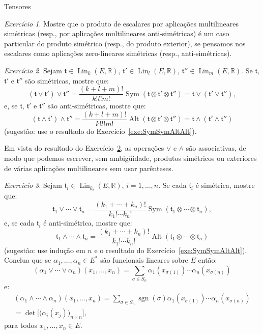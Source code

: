 \documentclass[oneside,11pt]{amsart}
\newcommand{\R}{\mathds R}
\DeclareMathOperator{\Lin}{Lin}
\DeclareMathOperator{\sgn}{sgn}
\DeclareMathOperator{\Sym}{Sym}
\DeclareMathOperator{\Alt}{Alt}
\theoremstyle{remark}\newtheorem{exercise}{Exercício}[section]
\theoremstyle{plain}\newtheorem{teo}{Teorema}[section]
\theoremstyle{plain}\newtheorem{lem}[teo]{Lema}
\theoremstyle{plain}\newtheorem{prop}[teo]{Proposição}
\theoremstyle{definition}\newtheorem{defin}[teo]{Definição}
\theoremstyle{remark}\newtheorem{rem}[teo]{Observação}
\theoremstyle{definition}\newtheorem{example}[teo]{Exemplo}
\numberwithin{equation}{section}
\begin{document}
\begin{section}{Tensores}
\begin{exercise}\label{exe:wedgeveezero}
Mostre que o produto de escalares por aplicações multilineares simétricas (resp., por aplicações multilineares anti-simétricas) é um caso particular
do produto simétrico (resp., do produto exterior), se pensamos nos escalares como aplicações zero-lineares simétricas (resp., anti-simétricas).
\end{exercise}

\begin{exercise}\label{exe:veewedgeassoc}
Sejam $\mathfrak t\in\Lin_k(E,\R)$, $\mathfrak t'\in\Lin_l(E,\R)$, $\mathfrak t''\in\Lin_m(E,\R)$. Se $\mathfrak t$, $\mathfrak t'$ e $\mathfrak t''$ são
simétricas, mostre que:
\[(\mathfrak t\vee\mathfrak t')\vee\mathfrak t''=\frac{(k+l+m)!}{k!l!m!}\Sym(\mathfrak t\otimes\mathfrak t'\otimes\mathfrak t'')=
\mathfrak t\vee(\mathfrak t'\vee\mathfrak t''),\]
e, se $\mathfrak t$, $\mathfrak t'$ e $\mathfrak t''$ são anti-simétricas, mostre que:
\[(\mathfrak t\wedge\mathfrak t')\wedge\mathfrak t''=\frac{(k+l+m)!}{k!l!m!}\Alt(\mathfrak t\otimes\mathfrak t'\otimes\mathfrak t'')=
\mathfrak t\wedge(\mathfrak t'\wedge\mathfrak t'')\]
(sugestão: use o resultado do Exercício~\ref{exe:SymSymAltAlt}).
\end{exercise}

Em vista do resultado do Exercício~\ref{exe:veewedgeassoc}, as operações $\vee$ e $\wedge$ são associativas, de modo que podemos escrever, sem ambigüidade,
produtos simétricos ou exteriores de várias aplicações multilineares sem usar parênteses.
\begin{exercise}
Sejam $\mathfrak t_i\in\Lin_{k_i}(E,\R)$, $i=1,\ldots,n$. Se cada $\mathfrak t_i$ é simétrica, mostre que:
\[\mathfrak t_1\vee\cdots\vee\mathfrak t_n=\frac{(k_1+\cdots+k_n)!}{k_1!\cdots k_n!}\Sym(\mathfrak t_1\otimes\cdots\otimes\mathfrak t_n),\]
e, se cada $\mathfrak t_i$ é anti-simétrica, mostre que:
\[\mathfrak t_1\wedge\cdots\wedge\mathfrak t_n=\frac{(k_1+\cdots+k_n)!}{k_1!\cdots k_n!}\Alt(\mathfrak t_1\otimes\cdots\otimes\mathfrak t_n)\]
(sugestão: use indução em $n$ e o resultado do Exercício~\ref{exe:SymSymAltAlt}).
Conclua que se $\alpha_1,\ldots,\alpha_n\in E^*$ são funcionais lineares sobre $E$ então:
\begin{equation}\label{eq:prodveefunc}
(\alpha_1\vee\cdots\vee\alpha_n)(x_1,\ldots,x_n)=\sum_{\sigma\in S_n}\alpha_1(x_{\sigma(1)})\cdots\alpha_n(x_{\sigma(n)})
\end{equation}
e:
\begin{multline}\label{eq:prodwedgefunc}
(\alpha_1\wedge\cdots\wedge\alpha_n)(x_1,\ldots,x_n)=\sum_{\sigma\in S_n}\sgn(\sigma)\alpha_1(x_{\sigma(1)})\cdots\alpha_n(x_{\sigma(n)})\\
=\det\!\big[\big(\alpha_i(x_j)\big)_{n\times n}\big],
\end{multline}
para todos $x_1,\ldots,x_n\in E$.
\end{exercise}


\end{section}
\end{document}
